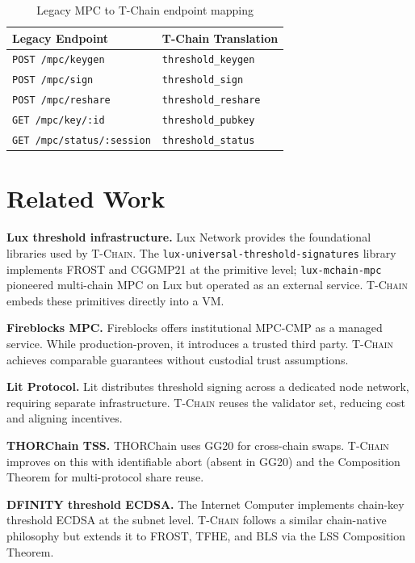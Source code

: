 \documentclass[11pt,letterpaper]{article}
\theoremstyle{definition}
\theoremstyle{remark}
\newcommand{\TChain}{\textsc{T-Chain}}
\newcommand{\LSS}{\textsc{LSS}}
\begin{document}
\begin{table}[h]
\centering
\begin{tabular}{ll}
\toprule
\textbf{Legacy Endpoint} & \textbf{T-Chain Translation} \\
\midrule
\texttt{POST /mpc/keygen} & \texttt{threshold\_keygen} \\
\texttt{POST /mpc/sign} & \texttt{threshold\_sign} \\
\texttt{POST /mpc/reshare} & \texttt{threshold\_reshare} \\
\texttt{GET /mpc/key/:id} & \texttt{threshold\_pubkey} \\
\texttt{GET /mpc/status/:session} & \texttt{threshold\_status} \\
\bottomrule
\end{tabular}
\caption{Legacy MPC to T-Chain endpoint mapping}
\label{tab:compat}
\end{table}

\section{Related Work}
\label{sec:related}

\textbf{Lux threshold infrastructure.} Lux Network provides the foundational libraries used by \TChain{}. The \texttt{lux-universal-threshold-signatures} library \cite{lux-threshold-sigs} implements FROST and CGGMP21 at the primitive level; \texttt{lux-mchain-mpc} \cite{lux-mchain-mpc} pioneered multi-chain MPC on Lux but operated as an external service. \TChain{} embeds these primitives directly into a VM.

\textbf{Fireblocks MPC.} Fireblocks \cite{fireblocks2023mpc} offers institutional MPC-CMP as a managed service. While production-proven, it introduces a trusted third party. \TChain{} achieves comparable guarantees without custodial trust assumptions.

\textbf{Lit Protocol.} Lit \cite{lit2023threshold} distributes threshold signing across a dedicated node network, requiring separate infrastructure. \TChain{} reuses the validator set, reducing cost and aligning incentives.

\textbf{THORChain TSS.} THORChain \cite{thorchain2023tss} uses GG20 for cross-chain swaps. \TChain{} improves on this with identifiable abort (absent in GG20) and the Composition Theorem for multi-protocol share reuse.

\textbf{DFINITY threshold ECDSA.} The Internet Computer \cite{dfinity2022tecdsa} implements chain-key threshold ECDSA at the subnet level. \TChain{} follows a similar chain-native philosophy but extends it to FROST, TFHE, and BLS via the \LSS{} Composition Theorem.
\end{document}
